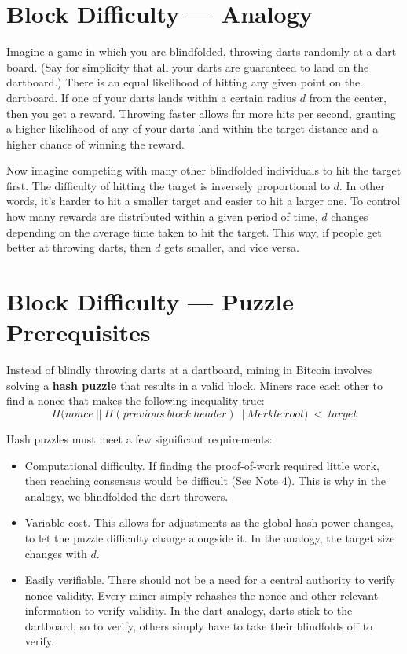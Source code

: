 \documentclass[full.tex]{subfiles}
\begin{document}
    \section*{Block Difficulty --- Analogy}
    
    Imagine a game in which you are blindfolded, throwing darts randomly at a dart board. (Say for simplicity that all your darts are guaranteed to land on the dartboard.) There is an equal likelihood of hitting any given point on the dartboard. If one of your darts lands within a certain radius $d$ from the center, then you get a reward. Throwing faster allows for more hits per second, granting a higher likelihood of any of your darts land within the target distance and a higher chance of winning the reward. 
    
    Now imagine competing with many other blindfolded individuals to hit the target first. The difficulty of hitting the target is inversely proportional to $d$. In other words, it's harder to hit a smaller target and easier to hit a larger one. To control how many rewards are distributed within a given period of time, $d$ changes depending on the average time taken to hit the target. This way, if people get better at throwing darts, then $d$ gets smaller, and vice versa.
    
    \section*{Block Difficulty --- Puzzle Prerequisites}
    
Instead of blindly throwing darts at a dartboard, mining in Bitcoin involves solving a \textbf{hash puzzle} that results in a valid block. Miners race each other to find a nonce that makes the following inequality true:
    $$H\big(nonce~||~H(previous~block~header)~||~Merkle~root\big)~<~target$$
    
    \noindent Hash puzzles must meet a few significant requirements:
    \begin{itemize}
        \item Computational difficulty. If finding the proof-of-work required little work, then reaching consensus would be difficult (See Note 4). This is why in the analogy, we blindfolded the dart-throwers. 
        \item Variable cost. This allows for adjustments as the global hash power changes, to let the puzzle difficulty change alongside it. In the analogy, the target size changes with $d$.
        \item Easily verifiable. There should not be a need for a central authority to verify nonce validity. Every miner simply rehashes the nonce and other relevant information to verify validity. In the dart analogy, darts stick to the dartboard, so to verify, others simply have to take their blindfolds off to verify.
    \end{itemize}
    
\end{document}
